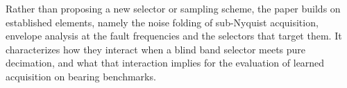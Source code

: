 Rather than proposing a new selector or sampling scheme, the paper builds on established elements,
namely the noise folding of sub-Nyquist acquisition, envelope analysis at the fault frequencies and
the selectors that target them. It characterizes how they interact when a blind band selector meets
pure decimation, and what that interaction implies for the evaluation of learned acquisition on
bearing benchmarks.
